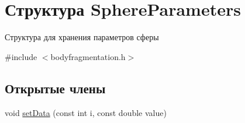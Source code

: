 \hypertarget{struct_sphere_parameters}{}\section{Структура Sphere\+Parameters}
\label{struct_sphere_parameters}


Структура для хранения параметров сферы  




{\ttfamily \#include $<$bodyfragmentation.\+h$>$}

\subsection*{Открытые члены}
\begin{DoxyCompactItemize}
\item 
void \mbox{\hyperlink{struct_sphere_parameters_a4cfbd8b09594f387641ee6c365fa9778}{set\+Data}} (const int i, const double value)
\end{DoxyCompactItemize}
